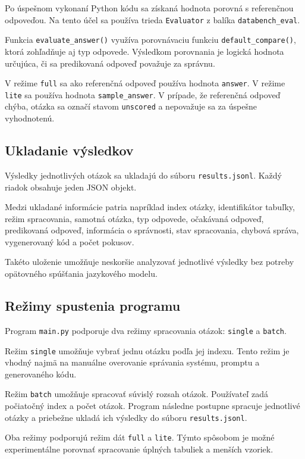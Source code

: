 Po úspešnom vykonaní Python kódu sa získaná hodnota porovná s referenčnou
odpoveďou. Na tento účel sa používa trieda \texttt{Evaluator} z balíka
\texttt{databench\_eval}.

Funkcia \texttt{evaluate\_answer()} využíva porovnávaciu funkciu
\texttt{default\_compare()}, ktorá zohľadňuje aj typ odpovede. Výsledkom
porovnania je logická hodnota určujúca, či sa predikovaná odpoveď považuje
za správnu.

V režime \texttt{full} sa ako referenčná odpoveď používa hodnota
\texttt{answer}. V režime \texttt{lite} sa používa hodnota
\texttt{sample\_answer}. V prípade, že referenčná odpoveď chýba, otázka
sa označí stavom \texttt{unscored} a nepovažuje sa za úspešne vyhodnotenú.

\subsection{Ukladanie výsledkov}

Výsledky jednotlivých otázok sa ukladajú do súboru
\texttt{results.jsonl}. Každý riadok obsahuje jeden JSON objekt.

Medzi ukladané informácie patria napríklad index otázky, identifikátor
tabuľky, režim spracovania, samotná otázka, typ odpovede, očakávaná
odpoveď, predikovaná odpoveď, informácia o správnosti, stav spracovania,
chybová správa, vygenerovaný kód a počet pokusov.

Takéto uloženie umožňuje neskoršie analyzovať jednotlivé výsledky bez
potreby opätovného spúšťania jazykového modelu.

\subsection{Režimy spustenia programu}

Program \texttt{main.py} podporuje dva režimy spracovania otázok:
\texttt{single} a \texttt{batch}.

Režim \texttt{single} umožňuje vybrať jednu otázku podľa jej indexu.
Tento režim je vhodný najmä na manuálne overovanie správania systému,
promptu a generovaného kódu.

Režim \texttt{batch} umožňuje spracovať súvislý rozsah otázok. Používateľ
zadá počiatočný index a počet otázok. Program následne postupne spracuje
jednotlivé otázky a priebežne ukladá ich výsledky do súboru
\texttt{results.jsonl}.

Oba režimy podporujú režim dát \texttt{full} a \texttt{lite}. Týmto
spôsobom je možné experimentálne porovnať spracovanie úplných tabuliek
a menších vzoriek.

